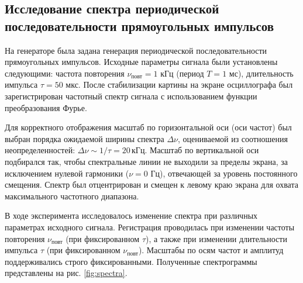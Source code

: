 \documentclass[reprint, amsmath, amssymb, aps, pra, nofootinbib]{revtex4-2}
\begin{document}
\subsection{Исследование спектра периодической последовательности прямоугольных импульсов}

На генераторе была задана генерация периодической последовательности прямоугольных импульсов.
Исходные параметры сигнала были установлены следующими: частота повторения $\nu_{\text{повт}} = 1$ кГц (период $T = 1$ мс), длительность импульса $\tau = 50$ мкс. После стабилизации картины на экране осциллографа был зарегистрирован частотный спектр сигнала с использованием функции преобразования Фурье.

Для корректного отображения масштаб по горизонтальной оси (оси частот) был выбран порядка ожидаемой ширины спектра $\Delta\nu$, оцениваемой из соотношения неопределенностей: $ \Delta \nu \sim 1/\tau = 20 \, \text{кГц}. $ Масштаб по вертикальной оси подбирался так, чтобы спектральные линии не выходили за пределы экрана, за исключением нулевой гармоники ($\nu = 0$ Гц), отвечающей за уровень постоянного смещения. Спектр был отцентрирован и смещен к левому краю экрана для охвата максимального частотного диапазона.

В ходе эксперимента исследовалось изменение спектра при различных параметрах исходного сигнала. Регистрация проводилась при изменении частоты повторения $\nu_{\text{повт}}$ (при фиксированном $\tau$), а также при изменении длительности импульса $\tau$ (при фиксированном $\nu_{\text{повт}}$). Масштабы по осям частот и амплитуд поддерживались строго фиксированными. Полученные спектрограммы представлены на рис. \ref{fig:spectra}.
\end{document}
